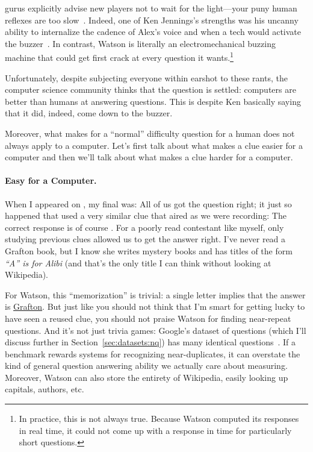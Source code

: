 \jeopardy{} gurus explicitly advise new players not to wait for the
light---your puny human reflexes are too slow~\citep{jennings-06}.
%
Indeed, one of Ken Jennings's strengths was his uncanny ability to
internalize the cadence of Alex's voice and when a tech would
activate the buzzer~\citep{jennings-06}.
%
In contrast, Watson is literally an electromechanical buzzing machine
that could get first crack at every question it wants.\footnote{In
practice, this is not always true.  Because Watson computed its
responses in real time, it could not come up with a response in time
for particularly short questions.}

Unfortunately, despite subjecting everyone within earshot to these
rants, the computer science community thinks that the question is
settled: computers are better than humans at answering questions.
%
This is despite Ken basically saying that it did, indeed, come down to
the buzzer.

Moreover, what makes for a ``normal'' difficulty question for a human
does not always apply to a computer.
%
Let's first talk about what makes a clue easier for a computer and
then we'll talk about what makes a clue harder for a computer.

\paragraph{Easy for a Computer.}

When I appeared on \jeopardy{}, my final \jeopardy{} was:
%
All of us got the question right; it just so happened that \jeopardy{}
used a very similar clue that aired as we were recording:
%
%
The correct response is of course .
%
For a poorly read contestant like myself, only studying previous clues
allowed us to get the answer right.
%
I've never read a Grafton book, but I know she writes mystery books and
has titles of the form \textit{``A'' is for Alibi} (and that's the
only title I can think without looking at Wikipedia).

For Watson, this ``memorization'' is trivial: a single letter
implies that the answer is \underline{Grafton}.
%
But just like you should not think that I'm smart for getting lucky to
have seen a reused clue, you should not praise Watson for finding
near-repeat questions.
%
And it's not just trivia games: Google's dataset of questions (which
I'll discuss further in Section~\ref{sec:datasets:nq}) has many
identical questions~\citep{lewis-21}.
%
If a benchmark rewards systems for recognizing near-duplicates, it can
overstate the kind of general question answering ability we actually
care about measuring.
%
Moreover, Watson can also store the entirety of Wikipedia, easily
looking up capitals, authors, etc.


